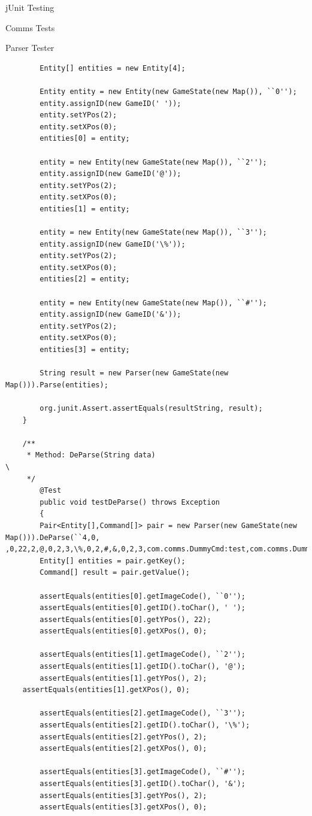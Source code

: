 \documentclass[12pt]{report}
\begin{document}
\begin{chapter}{jUnit Testing}
\begin{section}{Comms Tests}
\begin{subsection}{Parser Tester}
\begin{lstlisting}
        Entity[] entities = new Entity[4];

        Entity entity = new Entity(new GameState(new Map()), ``0'');
        entity.assignID(new GameID(' '));
        entity.setYPos(2);
        entity.setXPos(0);
        entities[0] = entity;

        entity = new Entity(new GameState(new Map()), ``2'');
        entity.assignID(new GameID('@'));
        entity.setYPos(2);
        entity.setXPos(0);
        entities[1] = entity;

        entity = new Entity(new GameState(new Map()), ``3'');
        entity.assignID(new GameID('\%'));                                                 
        entity.setYPos(2);
        entity.setXPos(0);
        entities[2] = entity;

        entity = new Entity(new GameState(new Map()), ``#'');
        entity.assignID(new GameID('&'));
        entity.setYPos(2);
        entity.setXPos(0);
        entities[3] = entity;

        String result = new Parser(new GameState(new Map())).Parse(entities);

        org.junit.Assert.assertEquals(resultString, result);
    }
    
    /**
     * Method: DeParse(String data)                                                      \
     */
        @Test
        public void testDeParse() throws Exception
        { 
        Pair<Entity[],Command[]> pair = new Parser(new GameState(new Map())).DeParse(``4,0, ,0,22,2,@,0,2,3,\%,0,2,#,&,0,2,3,com.comms.DummyCmd:test,com.comms.DummyCmd:test,com.comms.DummyCmd:test,'');
        Entity[] entities = pair.getKey();
        Command[] result = pair.getValue();

        assertEquals(entities[0].getImageCode(), ``0'');
        assertEquals(entities[0].getID().toChar(), ' ');
        assertEquals(entities[0].getYPos(), 22);
        assertEquals(entities[0].getXPos(), 0);

        assertEquals(entities[1].getImageCode(), ``2'');
        assertEquals(entities[1].getID().toChar(), '@');
        assertEquals(entities[1].getYPos(), 2);
	assertEquals(entities[1].getXPos(), 0);

        assertEquals(entities[2].getImageCode(), ``3'');
        assertEquals(entities[2].getID().toChar(), '\%');                                  
        assertEquals(entities[2].getYPos(), 2);
        assertEquals(entities[2].getXPos(), 0);

        assertEquals(entities[3].getImageCode(), ``#'');
        assertEquals(entities[3].getID().toChar(), '&');
        assertEquals(entities[3].getYPos(), 2);
        assertEquals(entities[3].getXPos(), 0);


\end{lstlisting}
\end{subsection}
\end{section}
\end{chapter}
\end{document}
